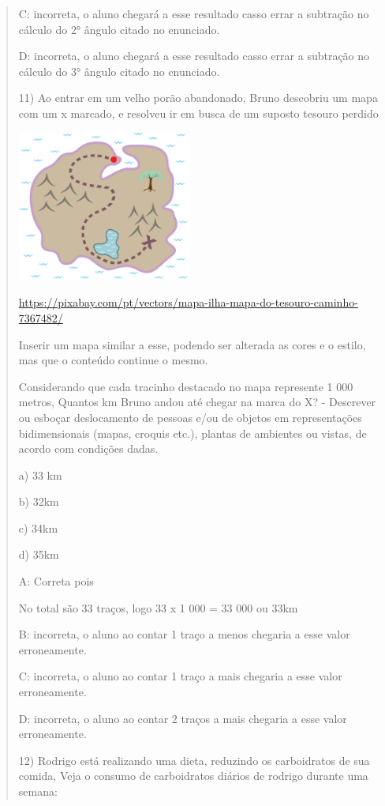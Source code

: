 \begin{quote}
\begin{escolha}
C: incorreta, o aluno chegará a esse resultado casso errar a subtração
no cálculo do 2° ângulo citado no enunciado.

D: incorreta, o aluno chegará a esse resultado casso errar a subtração
no cálculo do 3° ângulo citado no enunciado.

11) Ao entrar em um velho porão abandonado, Bruno descobriu um mapa com
um x marcado, e resolveu ir em busca de um suposto tesouro perdido

\includegraphics[width=2.27099in,height=1.95in]{./imgSAEB_8_MAT/media/image61.png}

\url{https://pixabay.com/pt/vectors/mapa-ilha-mapa-do-tesouro-caminho-7367482/}

Inserir um mapa similar a esse, podendo ser alterada as cores e o
estilo, mas que o conteúdo continue o mesmo.

Considerando que cada tracinho destacado no mapa represente 1 000
metros, Quantos km Bruno andou até chegar na marca do X? - Descrever ou
esboçar deslocamento de pessoas e/ou de objetos em representações
bidimensionais (mapas, croquis etc.), plantas de ambientes ou vistas, de
acordo com condições dadas.

a) 33 km

b) 32km

c) 34km

d) 35km

A: Correta pois

No total são 33 traços, logo 33 x 1 000 = 33 000 ou 33km

B: incorreta, o aluno ao contar 1 traço a menos chegaria a esse valor
erroneamente.

C: incorreta, o aluno ao contar 1 traço a mais chegaria a esse valor
erroneamente.

D: incorreta, o aluno ao contar 2 traços a mais chegaria a esse valor
erroneamente.

12) Rodrigo está realizando uma dieta, reduzindo os carboidratos de sua
comida, Veja o consumo de carboidratos diários de rodrigo durante uma
semana:


\end{escolha}
\end{quote}
